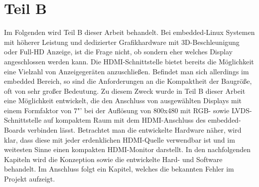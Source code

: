 \chapter{Teil B}
\label{cha:TeilB}
Im Folgenden wird Teil B dieser Arbeit behandelt. Bei embedded-Linux Systemen mit höherer Leistung und dedizierter Grafikhardware mit 3D-Beschleunigung oder Full-HD Anzeige, ist die Frage nicht, ob sondern eher welches Display angeschlossen werden kann. Die HDMI-Schnittstelle bietet bereits die Möglichkeit eine Vielzahl von Anzeigegeräten anzuschließen. Befindet man sich allerdings im embedded Bereich, so sind die Anforderungen an die Kompaktheit der Baugröße, oft von sehr großer Bedeutung. Zu diesem Zweck wurde in Teil B dieser Arbeit eine Möglichkeit entwickelt, die den Anschluss von ausgewählten Displays mit einem Formfaktor von 7"' bei der Auflösung von 800x480 mit RGB- sowie LVDS-Schnittstelle auf kompaktem Raum mit dem HDMI-Anschluss des embedded-Boards verbinden lässt. Betrachtet man die entwickelte Hardware näher, wird klar, dass diese mit jeder erdenklichen HDMI-Quelle verwendbar ist und im weitesten Sinne einen kompakten HDMI-Monitor darstellt.
In den nachfolgenden Kapiteln wird die Konzeption sowie die entwickelte Hard- und Software behandelt. Im Anschluss folgt ein Kapitel, welches die bekannten Fehler im Projekt aufzeigt.\newpage




